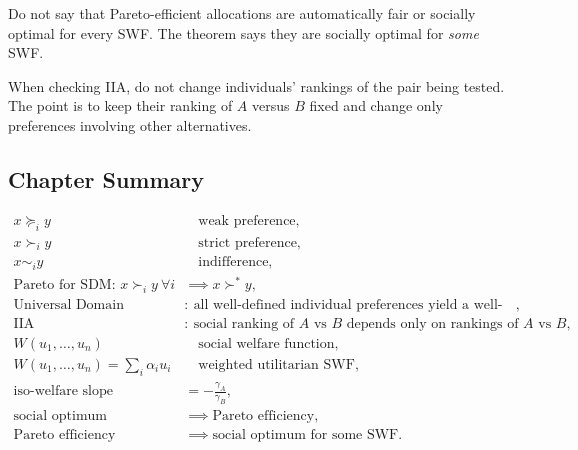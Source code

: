 \begin{commonmistake}
Do not say that Pareto-efficient allocations are automatically fair or socially optimal for every SWF. The theorem says they are socially optimal for \emph{some} SWF.
\end{commonmistake}

\begin{commonmistake}
When checking IIA, do not change individuals' rankings of the pair being tested. The point is to keep their ranking of $A$ versus $B$ fixed and change only preferences involving other alternatives.
\end{commonmistake}

\subsection{Chapter Summary}

\begin{keyformula}[title={Key Formula: Lecture 10 Summary}]
\begin{align*}
x \succeq_i y &\quad \text{weak preference}, \\
x \succ_i y &\quad \text{strict preference}, \\
x \sim_i y &\quad \text{indifference}, \\
\text{Pareto for SDM: } 
x \succ_i y \ \forall i &\implies x \succ^* y, \\
\text{Universal Domain} &:\ \text{all well-defined individual preferences yield a well-defined social ranking}, \\
\text{IIA} &:\ \text{social ranking of } A \text{ vs } B \text{ depends only on rankings of } A \text{ vs } B, \\
W(u_1,\dots,u_n) &\quad \text{social welfare function}, \\
W(u_1,\dots,u_n)=\sum_i \alpha_i u_i &\quad \text{weighted utilitarian SWF}, \\
\text{iso-welfare slope} &= -\frac{\gamma_A}{\gamma_B}, \\
\text{social optimum} &\implies \text{Pareto efficiency}, \\
\text{Pareto efficiency} &\implies \text{social optimum for some SWF}.
\end{align*}
\end{keyformula}

